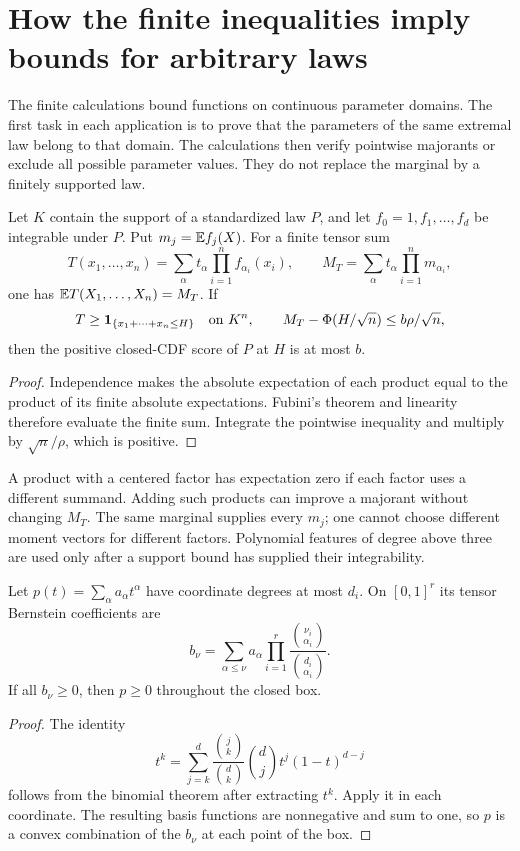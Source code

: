 \section{How the finite inequalities imply bounds for arbitrary laws}
\label{ext:finite-soundness}

The finite calculations bound functions on continuous parameter domains.
The first task in each application is to prove that the parameters of the
same extremal law belong to that domain. The calculations then verify
pointwise majorants or exclude all possible parameter values. They do not
replace the marginal by a finitely supported law.

\begin{lemma}
\label{ext:tensor-soundness}
Let $K$ contain the support of a standardized law $P$, and let
$f_0=1,f_1,\ldots,f_d$ be integrable under $P$. Put $m_j=\mathbb E f_j(X)$.
For a finite tensor sum
\[
 T(x_1,\ldots,x_n)=\sum_\alpha t_\alpha
                       \prod_{i=1}^n f_{\alpha_i}(x_i),
 \qquad M_T=\sum_\alpha t_\alpha\prod_{i=1}^n m_{\alpha_i},
\]
one has $\mathbb E T(X_1,\ldots,X_n)=M_T$. If
\[
 T\ge\mathbf 1_{\{x_1+\cdots+x_n\le H\}}\quad\hbox{on }K^n,
 \qquad M_T-\Phi(H/\sqrt n)\le b\rho/\sqrt n,
\]
then the positive closed-CDF score of $P$ at $H$ is at most $b$.
\end{lemma}
\begin{proof}
Independence makes the absolute expectation of each product equal to the
product of its finite absolute expectations. Fubini's theorem and linearity
therefore evaluate the finite sum. Integrate the pointwise inequality and
multiply by $\sqrt n/\rho$, which is positive.
\end{proof}

A product with a centered factor has expectation zero if each factor
uses a different summand. Adding such products can improve a majorant
without changing $M_T$. The same marginal supplies every $m_j$;
one cannot choose different moment vectors for different factors.
Polynomial features of degree above three are used only after a support
bound has supplied their integrability.

\begin{lemma}\label{ext:bernstein}
Let $p(t)=\sum_\alpha a_\alpha t^\alpha$ have coordinate degrees at most
$d_i$. On $[0,1]^r$ its tensor Bernstein coefficients are
\[
 b_\nu=\sum_{\alpha\le\nu}a_\alpha
                 \prod_{i=1}^r\frac{\binom{\nu_i}{\alpha_i}}
                                      {\binom{d_i}{\alpha_i}}.
\]
If all $b_\nu\ge0$, then $p\ge0$ throughout the closed box.
\end{lemma}
\begin{proof}
The identity
\[
 t^k=\sum_{j=k}^d\frac{\binom jk}{\binom dk}
              \binom dj t^j(1-t)^{d-j}
\]
follows from the binomial theorem after extracting $t^k$.
Apply it in each coordinate. The resulting basis functions are
nonnegative and sum to one, so $p$ is a convex combination of the
$b_\nu$ at each point of the box.
\end{proof}

